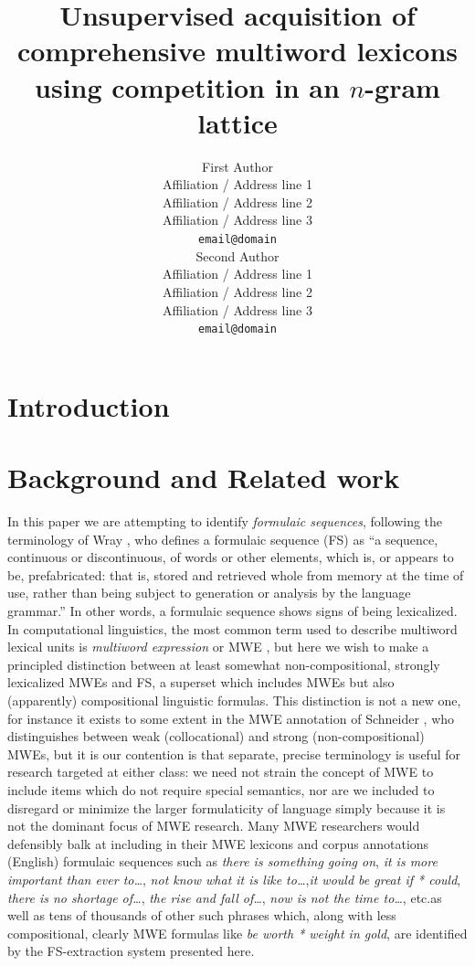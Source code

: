 \documentclass[11pt]{article}
\title{Unsupervised acquisition of comprehensive multiword lexicons \\ using competition in an $n$-gram lattice}
\author{First Author \\
  Affiliation / Address line 1 \\
  Affiliation / Address line 2 \\
  Affiliation / Address line 3 \\
  {\tt email@domain} \\\And
  Second Author \\
  Affiliation / Address line 1 \\
  Affiliation / Address line 2 \\
  Affiliation / Address line 3 \\
  {\tt email@domain} \\}
\date{}
\makeatletter
\def \etc {etc.\@ }
\makeatother
\begin{document}
\maketitle
\begin{abstract}

\end{abstract}

\section{Introduction}

\section{Background and Related work}

In this paper we are attempting to identify \emph{formulaic sequences}, following the terminology of Wray , who defines a formulaic sequence (FS) as ``a sequence, continuous or discontinuous, of words or other elements, which is, or appears to be, prefabricated: that is, stored and retrieved whole from memory at the time of use, rather than being subject to generation or analysis by the language grammar.'' In other words, a formulaic sequence shows signs of being lexicalized. In computational linguistics, the most common term used to describe multiword lexical units is \emph{multiword expression} or MWE \cite{Baldwin10}, but here we wish to make a principled distinction between at least somewhat non-compositional, strongly lexicalized MWEs and FS, a superset which includes MWEs but also (apparently) compositional linguistic formulas. This distinction is not a new one, for instance it exists to some extent in the MWE annotation of Schneider \cite{Schneider14a}, who distinguishes between weak (collocational) and strong (non-compositional) MWEs, but it is our contention is that separate, precise terminology is useful for research targeted at either class: we need not strain the concept of MWE to include items which do not require special semantics, nor are we included to disregard or minimize the larger formulaticity of language simply because it is not the dominant focus of MWE research. Many MWE researchers would defensibly balk at including in their MWE lexicons and corpus annotations (English) formulaic sequences such as \emph{there is something going on}, \emph{it is more important than ever to\ldots}, \emph{\ldotsdo not know what it is like to\ldots},\emph{it would be great if * could}, \emph{there is no shortage of\ldots}, \emph{the rise and fall of\ldots}, \emph{now is not the time to\ldots}, \etc as well as tens of thousands of other such phrases which, along with less compositional, clearly MWE formulas like \emph{be worth * weight in gold}, are identified by the FS-extraction system presented here.
\end{document}
